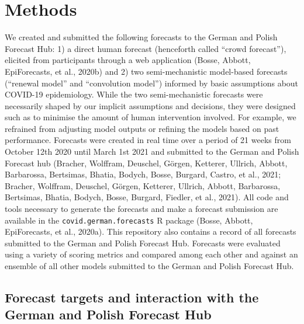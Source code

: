 \documentclass[
]{article}
\begin{document}
\hypertarget{methods}{%
\section{Methods}\label{methods}}

We created and submitted the following forecasts to the German and Polish Forecast Hub: 1) a direct human forecast (henceforth called ``crowd forecast''), elicited from participants through a web application (Bosse, Abbott, EpiForecasts, et al., 2020b) and 2) two semi-mechanistic model-based forecasts (``renewal model'' and ``convolution model'') informed by basic assumptions about COVID-19 epidemiology. While the two semi-mechanistic forecasts were necessarily shaped by our implicit assumptions and decisions, they were designed such as to minimise the amount of human intervention involved. For example, we refrained from adjusting model outputs or refining the models based on past performance. Forecasts were created in real time over a period of 21 weeks from October 12th 2020 until March 1st 2021 and submitted to the German and Polish Forecast hub (Bracher, Wolffram, Deuschel, Görgen, Ketterer, Ullrich, Abbott, Barbarossa, Bertsimas, Bhatia, Bodych, Bosse, Burgard, Castro, et al., 2021; Bracher, Wolffram, Deuschel, Görgen, Ketterer, Ullrich, Abbott, Barbarossa, Bertsimas, Bhatia, Bodych, Bosse, Burgard, Fiedler, et al., 2021). All code and tools necessary to generate the forecasts and make a forecast submission are available in the \texttt{covid.german.forecasts} R package (Bosse, Abbott, EpiForecasts, et al., 2020a). This repository also contains a record of all forecasts submitted to the German and Polish Forecast Hub. Forecasts were evaluated using a variety of scoring metrics and compared among each other and against an ensemble of all other models submitted to the German and Polish Forecast Hub.

\hypertarget{forecast-targets-and-interaction-with-the-german-and-polish-forecast-hub}{%
\subsection{Forecast targets and interaction with the German and Polish Forecast Hub}\label{forecast-targets-and-interaction-with-the-german-and-polish-forecast-hub}}
\end{document}
